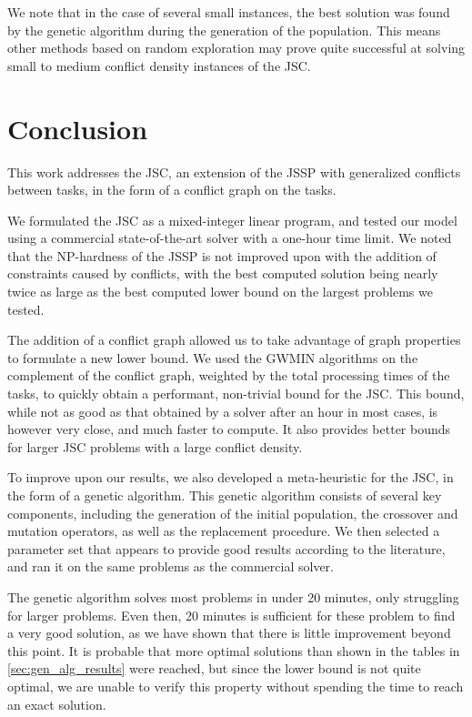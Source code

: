 \documentclass{mimosis}
\begin{document}
We note that in the case of several small instances, the best solution was found by the genetic algorithm during the generation of the population. This means other methods based on random exploration may prove quite successful at solving small to medium conflict density instances of the JSC.

\chapter*{Conclusion}

This work addresses the JSC, an extension of the JSSP with generalized conflicts between tasks, in the form of a conflict graph on the tasks.

We formulated the JSC as a mixed-integer linear program, and tested our model using a commercial state-of-the-art solver with a one-hour time limit. We noted that the NP-hardness of the JSSP is not improved upon with the addition of constraints caused by conflicts, with the best computed solution being nearly twice as large as the best computed lower bound on the largest problems we tested.

The addition of a conflict graph allowed us to take advantage of graph properties to formulate a new lower bound. We used the GWMIN algorithms on the complement of the conflict graph, weighted by the total processing times of the tasks, to quickly obtain a performant, non-trivial bound for the JSC. This bound, while not as good as that obtained by a solver after an hour in most cases, is however very close, and much faster to compute. It also provides better bounds for larger JSC problems with a large conflict density.

To improve upon our results, we also developed a meta-heuristic for the JSC, in the form of a genetic algorithm. This genetic algorithm consists of several key components, including the generation of the initial population, the crossover and mutation operators, as well as the replacement procedure. We then selected a parameter set that appears to provide good results according to the literature, and ran it on the same problems as the commercial solver.

The genetic algorithm solves most problems in under 20 minutes, only struggling for larger problems. Even then, 20 minutes is sufficient for these problem to find a very good solution, as we have shown that there is little improvement beyond this point. It is probable that more optimal solutions than shown in the tables in \cref{sec:gen_alg_results} were reached, but since the lower bound is not quite optimal, we are unable to verify this property without spending the time to reach an exact solution.
\end{document}
